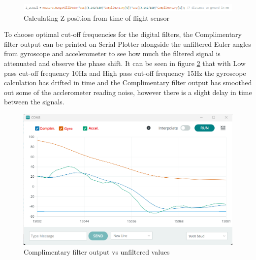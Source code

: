 \begin{figure}[H]
    \begin{center}
    \includegraphics[scale = 0.85]{pictures/IMU/Z_actual_trinagulation.png}
    \end{center}
    \caption{Calculating Z position from time of flight sensor}
    \label{fig:calc_z}
\end{figure}



To choose optimal cut-off frequencies for the digital filters, the Complimentary filter output can be printed on Serial Plotter alongside the unfiltered Euler angles from gyroscope and accelerometer to see how much the filtered signal is attenuated and observe the phase shift. It can be seen in figure \ref{fig:serial_plot} that with Low pass cut-off frequency 10Hz and High pass cut-off frequency 15Hz the gyroscope calculation has drifted in time and the Complimentary filter output has smoothed out some of the acclerometer reading noise, however there is a slight delay in time between the signals.


\begin{figure}[H]
    \begin{center}
    \includegraphics[scale = 0.65]{pictures/IMU/Serial_monitor.png}
    \end{center}
    \caption{Complimentary filter output vs unfiltered values}
    \label{fig:serial_plot}
\end{figure}
